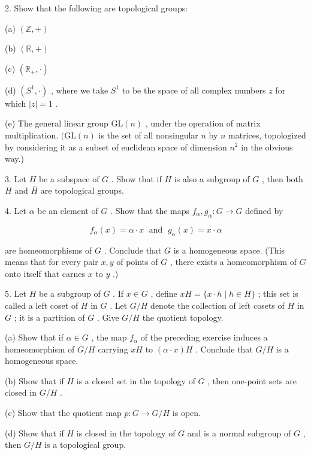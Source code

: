 \documentclass[10pt]{article}
\begin{document}
2. Show that the following are topological groups:

(a) \(\left( {\mathbb{Z}, + }\right)\)

(b) \(\left( {\mathbb{R}, + }\right)\)

(c) \(\left( {{\mathbb{R}}_{ + }, \cdot  }\right)\)

(d) \(\left( {{S}^{1}, \cdot  }\right)\) , where we take \({S}^{1}\) to be the space of all complex numbers \(z\) for which \(\left| z\right|  = 1\) .

(e) The general linear group \(\mathrm{{GL}}\left( n\right)\) , under the operation of matrix multiplication. \((\mathrm{{GL}}\left( n\right)\) is the set of all nonsingular \(n\) by \(n\) matrices, topologized by considering it as a subset of euclidean space of dimension \({n}^{2}\) in the obvious way.)

3. Let \(H\) be a subspace of \(G\) . Show that if \(H\) is also a subgroup of \(G\) , then both \(H\) and \(\bar{H}\) are topological groups.

4. Let \(\alpha\) be an element of \(G\) . Show that the maps \({f}_{\alpha },{g}_{\alpha } : G \rightarrow  G\) defined by

\[
{f}_{\alpha }\left( x\right)  = \alpha  \cdot  x\;\text{ and }\;{g}_{\alpha }\left( x\right)  = x \cdot  \alpha
\]

are homeomorphisms of \(G\) . Conclude that \(G\) is a homogeneous space. (This means that for every pair \(x,y\) of points of \(G\) , there exists a homeomorphism of \(G\) onto itself that carnes \(x\) to \(y\) .)

5. Let \(H\) be a subgroup of \(G\) . If \(x \in  G\) , define \({xH} = \{ x \cdot  h \mid  h \in  H\}\) ; this set is called a left coset of \(H\) in \(G\) . Let \(G/H\) denote the collection of left cosets of \(H\) in \(G\) ; it is a partition of \(G\) . Give \(G/H\) the quotient topology.

(a) Show that if \(\alpha  \in  G\) , the map \({f}_{\alpha }\) of the preceding exercise induces a homeomorphism of \(G/H\) carrying \({xH}\) to \(\left( {\alpha  \cdot  x}\right) H\) . Conclude that \(G/H\) is a homogeneous space.

(b) Show that if \(H\) is a closed set in the topology of \(G\) , then one-point sets are closed in \(G/H\) .

(c) Show that the quotient map \(p : G \rightarrow  G/H\) is open.

(d) Show that if \(H\) is closed in the topology of \(G\) and is a normal subgroup of \(G\) , then \(G/H\) is a topological group.
\end{document}
